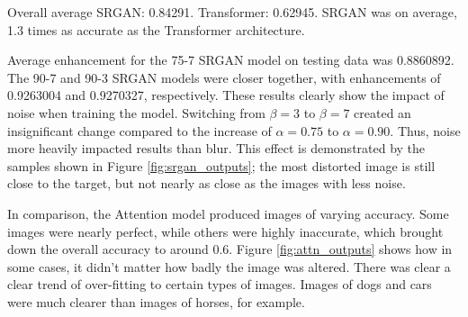 \documentclass[letterpaper]{article} %
\begin{document}
Overall average SRGAN: 0.84291. Transformer: 0.62945.
SRGAN was on average, 1.3 times as accurate as the Transformer architecture.

Average enhancement for the 75-7 SRGAN model on testing data was 0.8860892.
The 90-7 and 90-3 SRGAN models were closer together, with enhancements of
0.9263004 and 0.9270327, respectively.
These results clearly show the impact of noise when training the model.
Switching from $\beta = 3$ to $\beta = 7$ created an insignificant change
compared to the increase of $\alpha = 0.75$ to $\alpha = 0.90$.
Thus, noise more heavily impacted results than blur.
This effect is demonstrated by the samples shown in Figure \ref{fig:srgan_outputs};
the most distorted image is still close to the target, but not nearly as close as the
images with less noise.

In comparison, the Attention model produced images of varying accuracy.
Some images were nearly perfect, while others were highly inaccurate,
which brought down the overall accuracy to around 0.6. %
Figure \ref{fig:attn_outputs} shows how in some cases, it didn't matter how
badly the image was altered.
There was clear a clear trend of over-fitting to certain types of images.
Images of dogs and cars were much clearer than images of horses, for example.
\end{document}
